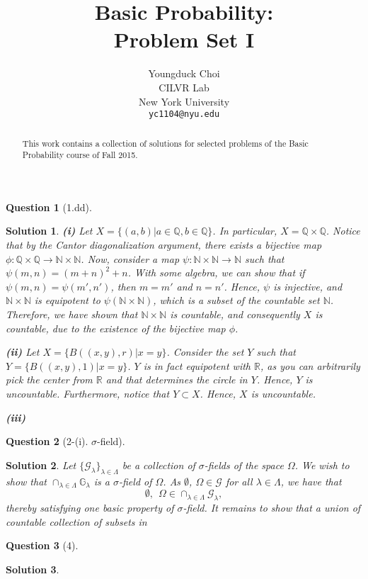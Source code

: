 \documentclass{article} %
\title{Basic Probability: \\
Problem Set I}
\author{
Youngduck Choi \\
CILVR Lab \\
New York University\\
\texttt{yc1104@nyu.edu} \\
}
\theoremstyle{quest}
\newtheorem*{question}{Question}
\newtheorem*{solution}{Solution}
\begin{document}
\maketitle

\begin{abstract}
This work contains a collection of solutions for selected problems 
of the Basic Probability course of Fall 2015.
\end{abstract}

\begin{question}[1.dd]
\end{question}
\begin{solution}
\textbf{(i)}
Let $X = \{ (a,b) | a \in \mathbb{Q}, b \in \mathbb{Q} \}$. In particular, $X = \mathbb{Q}
\times \mathbb{Q}$. Notice that by the Cantor diagonalization argument, there exists
a bijective map $\phi: \mathbb{Q} \times \mathbb{Q} \to \mathbb{N} \times \mathbb{N}$. Now,
consider a map $\psi: \mathbb{N} \times \mathbb{N} \to \mathbb{N}$ such that $\psi(m,n) = (m+n)^2 + n$.
With some algebra, we can show that if $\psi(m,n) = \psi(m',n')$, then $m = m'$ and $n = n'$. Hence,
$\psi$ is injective, and $\mathbb{N} \times \mathbb{N}$ is equipotent to $\psi(\mathbb{N} \times \mathbb{N})$,
which is a subset of the countable set $\mathbb{N}$. Therefore, we have shown that $\mathbb{N} \times \mathbb{N}$
is countable, and consequently $X$ is countable, due to the existence of the bijective map $\phi$.

\bigskip

\textbf{(ii)}
Let $X = \{ B((x,y),r) | x = y \}$. Consider the set $Y$ such that $Y = \{ B((x,y),1) | x = y \}$. $Y$ is in fact
equipotent with $\mathbb{R}$, as you can arbitrarily pick the center from $\mathbb{R}$ and that determines the
circle in $Y$. Hence, $Y$ is uncountable. Furthermore, notice that $Y \subset X$. Hence, $X$ is uncountable.

\bigskip

\textbf{(iii)}



\end{solution}

\bigskip

\begin{question}[2-(i). $\sigma$-field]
\end{question}
\begin{solution}
Let $\{ \mathcal{G}_{\lambda} \}_{\lambda \in \Lambda}$ be a collection of $\sigma$-fields
of the space $\Omega$.
We wish to show that $\cap_{\lambda \in \Lambda} \mathbb{G}_{\lambda}$ is a $\sigma$-field of $\Omega$.
As $\emptyset$, $\Omega \in \mathcal{G}$ for all $\lambda \in \Lambda$, we have that
\[
\emptyset, \>\> \Omega \in \cap_{\lambda \in \Lambda} \mathcal{G}_{\lambda},
\]
thereby satisfying one basic property of $\sigma$-field. It remains to show that 
a union of countable collection of subsets in 

\end{solution}

\bigskip

\begin{question}[4]
\end{question}
\begin{solution}
\end{solution}
\end{document}
